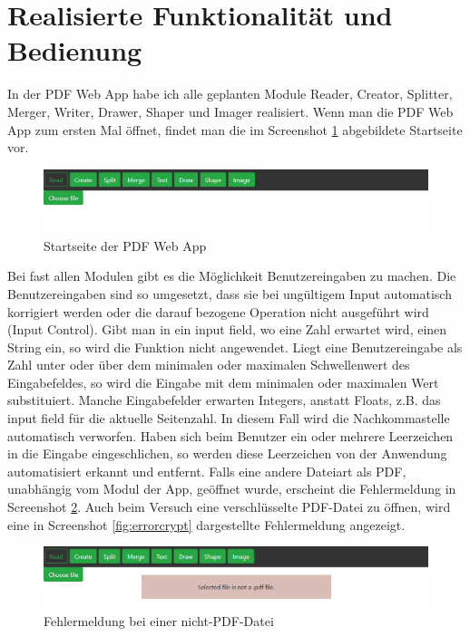 \section{Realisierte Funktionalität und Bedienung}
In der PDF Web App habe ich alle geplanten Module Reader, Creator, Splitter, Merger, Writer, Drawer, Shaper und Imager realisiert. Wenn man die PDF Web App zum ersten Mal öffnet, findet man die im Screenshot \ref{fig:start} abgebildete Startseite vor.

\begin{figure}[!htbp]
	\centering
	\includegraphics[width=1\textwidth]{"images/startseite.png"}
	\caption{Startseite der PDF Web App}
	\label{fig:start}
\end{figure}

Bei fast allen Modulen gibt es die Möglichkeit Benutzereingaben zu machen. Die Benutzereingaben sind so umgesetzt, dass sie bei ungültigem Input automatisch korrigiert werden oder die darauf bezogene Operation nicht ausgeführt wird (Input Control). Gibt man in ein input field, wo eine Zahl erwartet wird, einen String ein, so wird die Funktion nicht angewendet. Liegt eine Benutzereingabe als Zahl unter oder über dem minimalen oder maximalen Schwellenwert des Eingabefeldes, so wird die Eingabe mit dem minimalen oder maximalen Wert substituiert. Manche Eingabefelder erwarten Integers, anstatt Floats, z.B. das input field für die aktuelle Seitenzahl. In diesem Fall wird die Nachkommastelle automatisch verworfen. Haben sich beim Benutzer ein oder mehrere Leerzeichen in die Eingabe eingeschlichen, so werden diese Leerzeichen von der Anwendung automatisiert erkannt und entfernt. Falls eine andere Dateiart als PDF, unabhängig vom Modul der App, geöffnet wurde, erscheint die Fehlermeldung in Screenshot \ref{fig:errorfile}. Auch beim Versuch eine verschlüsselte PDF-Datei zu öffnen, wird eine in Screenshot \ref{fig:errorcrypt} dargestellte Fehlermeldung angezeigt.

\begin{figure}[!htbp]
	\centering
	\includegraphics[width=1\textwidth]{"images/errorfile.png"}
	\caption{Fehlermeldung bei einer nicht-PDF-Datei}
	\label{fig:errorfile}
\end{figure}

